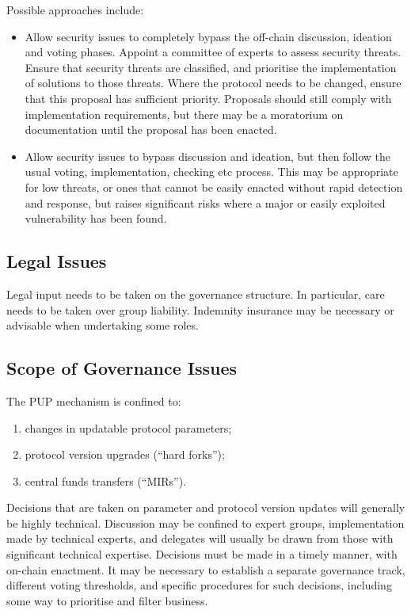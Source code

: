 
Possible approaches include:

\begin{itemize}
\item
  Allow security issues to completely bypass the off-chain discussion, ideation and voting phases.  Appoint a committee of experts to assess security threats.
  Ensure that security threats are classified, and prioritise the implementation of solutions to those threats.  Where the protocol needs to be changed, ensure that this
  proposal has sufficient priority.  Proposals should still comply with implementation requirements, but there may be a moratorium on documentation until the proposal has
  been enacted.
\item
  Allow security issues to bypass discussion and ideation, but then follow the usual voting, implementation, checking etc process.  This may be appropriate for low threats,
  or ones that cannot be easily enacted without rapid detection and response, but raises significant risks where a major or easily exploited vulnerability has been found.
\end{itemize}


\subsection{Legal Issues}

Legal input needs to be taken on the governance structure.  In particular, care needs to be taken over group liability.  Indemnity insurance may be necessary or advisable when
undertaking some roles.



\subsection{Scope of Governance Issues}

The PUP mechanism is confined to:

\begin{enumerate}
\item
  changes in updatable protocol parameters;
\item
  protocol version upgrades (``hard forks'');
\item
  central funds transfers (``MIRs'').
\end{enumerate}

Decisions that are taken on parameter and protocol version updates will generally be highly technical.  Discussion may be confined to expert groups, implementation made by
technical experts, and delegates will usually be drawn from those with significant technical expertise.  Decisions must be made in a timely manner, with on-chain enactment.
It may be necessary to establish a separate governance track, different voting thresholds, and specific procedures for such decisions, including some way to prioritise and
filter business.
